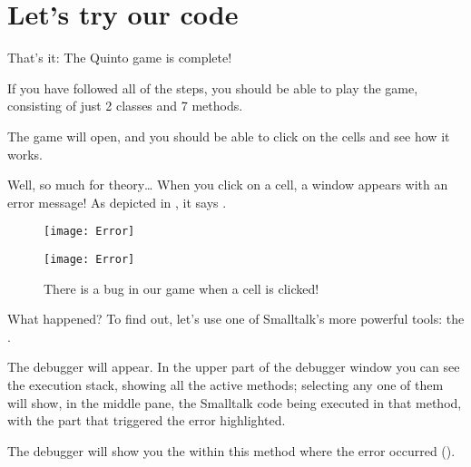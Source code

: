 \documentclass[a4paper,10pt,twoside]{book}
\begin{document}
\section{Let's try our code}

That's it:
The Quinto game is complete!

If you have followed all of the steps, you should be able to play the game, consisting of just 2 classes and 7 methods.


The game will open, and you should be able to click on the cells and see how it works.

Well, so much for theory\ldots{}
When you click on a cell, a  window appears with an error message!
As depicted in , it says .

\begin{figure}[ht]
\ifluluelse
	{\centerline{\texttt{[image: Error]}}}
	{\centerline{\texttt{[image: Error]}}}
\caption{There is a bug in our game when a cell is clicked!
\label{fig:quintoError}}
\end{figure}

\noindent
What happened?
To find out, let's use one of Smalltalk's more powerful tools: the .

The debugger will appear.
In the upper part of the debugger window you can see the execution stack, showing all the active methods; selecting any one of them will show, in the middle pane, the Smalltalk code being executed in that method, with the part that triggered the error highlighted.

The debugger will show you the  within this method where the error occurred ().
\end{document}
